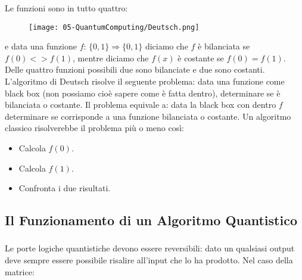 


\pagebreak 
\subsubsection{}
Le funzioni sono in tutto quattro:

\begin{figure}[h]
  \texttt{[image: 05-QuantumComputing/Deutsch.png]}
\end{figure}
e data una funzione $f$: $\{0,1\} \Rightarrow \{0,1\}$ diciamo che $f$ è bilanciata
se $f(0) <> f(1)$, mentre diciamo che $f(x)$ è costante se $f(0) = f(1)$. Delle quattro funzioni possibili due sono bilanciate
e due sono costanti. L’algoritmo di Deutsch risolve il seguente problema: data una
funzione come black box (non possiamo cioè sapere
come è fatta dentro), determinare se è bilanciata o costante.
Il problema equivale a: data la black box con dentro $f$
determinare se corrisponde a una funzione bilanciata o costante.
Un algoritmo classico risolverebbe il problema più o meno così: 

\begin{itemize}
  \item Calcola $f(0)$.
  \item Calcola $f(1)$. 
  \item Confronta i due risultati.
\end{itemize}

\subsection{Il Funzionamento di un Algoritmo Quantistico}

\subsubsection{}
Le porte logiche quantistiche devono essere
reversibili: dato un qualsiasi output deve sempre essere possibile
risalire all’input che lo ha prodotto. Nel caso della matrice: 

